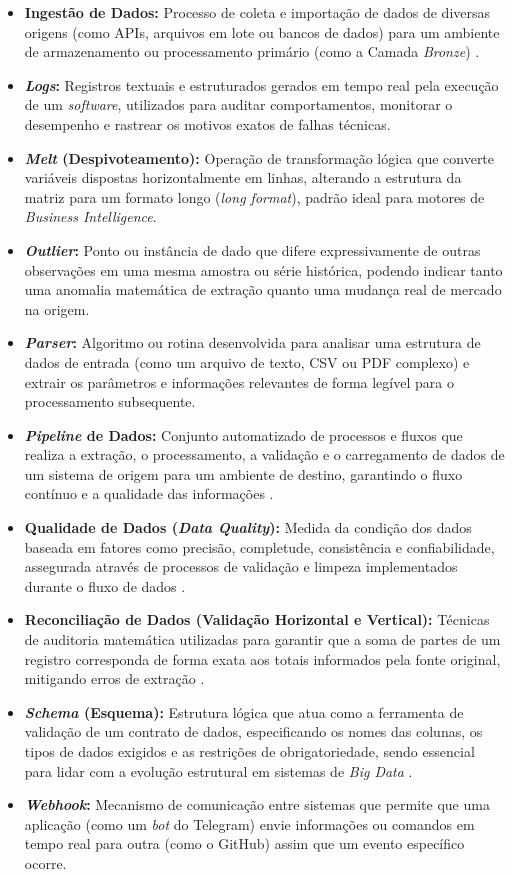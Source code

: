 \documentclass[
	12pt,				%
	openright,			%
	oneside,			%
	a4paper,			%
	english,			%
	brazil				%
	]{abntex2}
\begin{document}
\begin{apendicesenv}
\begin{itemize}
    \item \textbf{Ingestão de Dados:} Processo de coleta e importação de dados de diversas origens (como APIs, arquivos em lote ou bancos de dados) para um ambiente de armazenamento ou processamento primário (como a Camada \textit{Bronze}) \cite{polisetty23}.
    \item \textbf{\textit{Logs}:} Registros textuais e estruturados gerados em tempo real pela execução de um \textit{software}, utilizados para auditar comportamentos, monitorar o desempenho e rastrear os motivos exatos de falhas técnicas.
    \item \textbf{\textit{Melt} (Despivoteamento):} Operação de transformação lógica que converte variáveis dispostas horizontalmente em linhas, alterando a estrutura da matriz para um formato longo (\textit{long format}), padrão ideal para motores de \textit{Business Intelligence}.
    \item \textbf{\textit{Outlier}:} Ponto ou instância de dado que difere expressivamente de outras observações em uma mesma amostra ou série histórica, podendo indicar tanto uma anomalia matemática de extração quanto uma mudança real de mercado na origem.
    \item \textbf{\textit{Parser}:} Algoritmo ou rotina desenvolvida para analisar uma estrutura de dados de entrada (como um arquivo de texto, CSV ou PDF complexo) e extrair os parâmetros e informações relevantes de forma legível para o processamento subsequente.
    \item \textbf{\textit{Pipeline} de Dados:} Conjunto automatizado de processos e fluxos que realiza a extração, o processamento, a validação e o carregamento de dados de um sistema de origem para um ambiente de destino, garantindo o fluxo contínuo e a qualidade das informações \cite{polisetty23}.
    \item \textbf{Qualidade de Dados (\textit{Data Quality}):} Medida da condição dos dados baseada em fatores como precisão, completude, consistência e confiabilidade, assegurada através de processos de validação e limpeza implementados durante o fluxo de dados \cite{polisetty23}.
    \item \textbf{Reconciliação de Dados (Validação Horizontal e Vertical):} Técnicas de auditoria matemática utilizadas para garantir que a soma de partes de um registro corresponda de forma exata aos totais informados pela fonte original, mitigando erros de extração \cite{polisetty23}.
    \item \textbf{\textit{Schema} (Esquema):} Estrutura lógica que atua como a ferramenta de validação de um contrato de dados, especificando os nomes das colunas, os tipos de dados exigidos e as restrições de obrigatoriedade, sendo essencial para lidar com a evolução estrutural em sistemas de \textit{Big Data} \cite{liao20}.
    \item \textbf{\textit{Webhook}:} Mecanismo de comunicação entre sistemas que permite que uma aplicação (como um \textit{bot} do Telegram) envie informações ou comandos em tempo real para outra (como o GitHub) assim que um evento específico ocorre.
\end{itemize}
\end{apendicesenv}


\printindex
\end{document}
